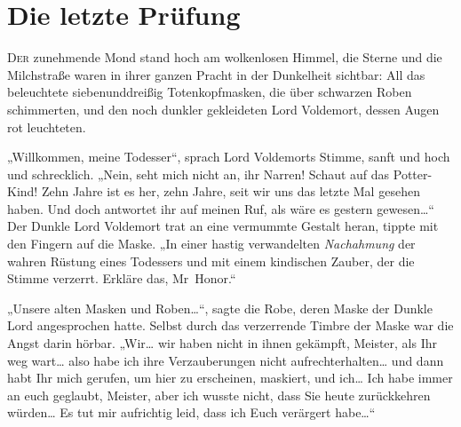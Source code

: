 \chapter{Die letzte Prüfung}

\lettrine{D}{er} zunehmende Mond stand hoch am wolkenlosen Himmel, die Sterne und die Milchstraße waren in ihrer ganzen Pracht in der Dunkelheit sichtbar: All das beleuchtete siebenunddreißig Totenkopfmasken, die über schwarzen Roben schimmerten, und den noch dunkler gekleideten Lord Voldemort, dessen Augen rot leuchteten.

„Willkommen, meine Todesser“, sprach Lord Voldemorts Stimme, sanft und hoch und schrecklich. „Nein, seht mich nicht an, ihr Narren! Schaut auf das Potter-Kind! Zehn Jahre ist es her, zehn Jahre, seit wir uns das letzte Mal gesehen haben. Und doch antwortet ihr auf meinen Ruf, als wäre es gestern gewesen…“
Der Dunkle Lord Voldemort trat an eine vermummte Gestalt heran, tippte mit den Fingern auf die Maske.
„In einer hastig verwandelten \emph{Nachahmung} der wahren Rüstung eines Todessers und mit einem kindischen Zauber, der die Stimme verzerrt. Erkläre das, Mr~Honor.“

„Unsere alten Masken und Roben…“, sagte die Robe, deren Maske der Dunkle Lord angesprochen hatte. Selbst durch das verzerrende Timbre der Maske war die Angst darin hörbar. „Wir… wir haben nicht in ihnen gekämpft, Meister, als Ihr weg wart… also habe ich ihre Verzauberungen nicht aufrechterhalten… und dann habt Ihr mich gerufen, um hier zu erscheinen, maskiert, und ich… Ich habe immer an euch geglaubt, Meister, aber ich wusste nicht, dass Sie heute zurückkehren würden… Es tut mir aufrichtig leid, dass ich Euch verärgert habe…“

